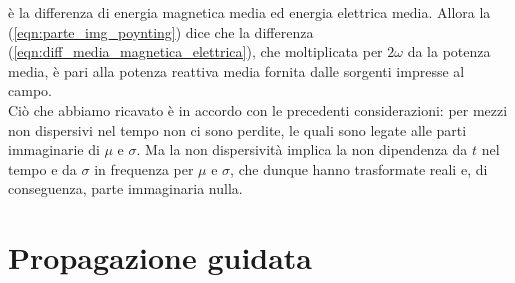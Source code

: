 \documentclass{book}
\begin{document}
        è la differenza di energia magnetica media ed energia elettrica media. Allora la (\ref{eqn:parte_img_poynting})
        dice che la differenza (\ref{eqn:diff_media_magnetica_elettrica}), che moltiplicata per $2 \omega$ da la potenza media, è
        pari alla potenza reattiva media fornita dalle sorgenti impresse al campo.
        \\ Ciò che abbiamo ricavato è in accordo con le precedenti considerazioni: per mezzi non dispersivi nel tempo
        non ci sono perdite, le quali sono legate alle parti immaginarie di $\mu$ e $\sigma$. Ma la non dispersività implica la
        non dipendenza da $t$ nel tempo e da $\sigma$ in frequenza per $\mu$ e $\sigma$, che dunque hanno trasformate reali e, di conseguenza,
        parte immaginaria nulla.

\chapter{Propagazione guidata}
\end{document}
